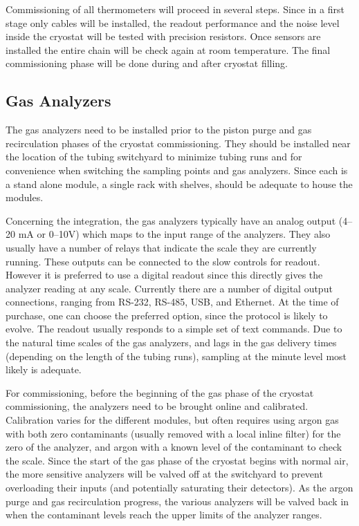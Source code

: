Commissioning of all thermometers will proceed in several steps. Since in a first stage only cables will be installed,
the readout performance and the noise level inside the cryostat will be
tested with precision resistors. Once sensors are installed the entire chain will be check again at room temperature.
The final commissioning phase will be done during and after cryostat filling.  


\subsection{Gas Analyzers}
\label{sec:fdgen-slow-cryo-install-ga}
 
The gas analyzers need to be installed prior to the piston purge and gas recirculation phases of the cryostat commissioning. They should be installed near the location of the tubing switchyard to minimize tubing runs and for convenience when switching the sampling points and gas analyzers. Since each is a stand alone module, a single rack with shelves, should be adequate to house the modules.

Concerning the integration, the gas analyzers typically have an analog output (\numrange{4}{20} \si{mA} or \numrange{0}{10}\si{V}) which maps to the input range of the analyzers. They also usually have a number of relays that indicate the scale they are currently running. These outputs can be connected to the slow controls for readout. However it is preferred to use a digital readout since this directly gives the analyzer reading at any scale. Currently there are a number of digital output connections, ranging from RS-232, RS-485, USB, and Ethernet. At the time of purchase, one can choose the preferred option, since the protocol is likely to evolve. The readout usually responds to a simple set of text commands. Due to the natural time scales of the gas analyzers, and lags in the gas delivery times (depending on the length of the tubing runs), sampling at the minute level most likely is adequate. 

For commissioning, before the beginning of the gas phase of the cryostat commissioning, the analyzers need to be brought online and calibrated. Calibration varies for the different modules, but often requires using argon gas with both zero contaminants (usually removed with a local inline filter) for the zero of the analyzer, and argon with a known level of the contaminant to check the scale. Since the start of the gas phase of the cryostat begins with normal air, the more sensitive analyzers will be valved off at the switchyard to prevent overloading their inputs (and potentially saturating their detectors). As the argon purge and gas recirculation progress, the various analyzers will be valved back in when the contaminant levels reach the upper limits of the analyzer ranges. 

